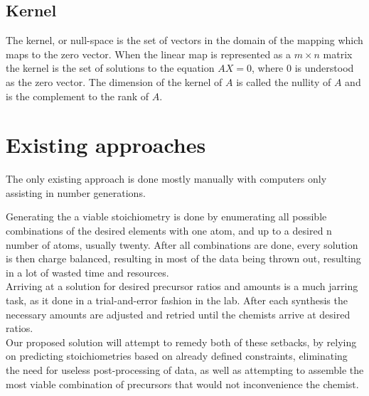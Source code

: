 \subsection{Kernel}
The kernel, or null-space is the set of vectors in the domain of the mapping which maps to the zero vector. When the linear map is represented as a $m \times n$ matrix the kernel is the set of solutions to the equation $AX = 0$, where $0$ is understood as the zero vector. The dimension of the kernel of $A$ is called the nullity of $A$ and is the complement to the rank of $A$.

\section{Existing approaches}
The only existing approach is done mostly manually with computers only assisting in number generations.

Generating the a viable stoichiometry is done by enumerating all possible combinations of the desired elements with one atom, and up to a desired n number of atoms, usually twenty. After all combinations are done, every solution is then charge balanced, resulting in most of the data being thrown out, resulting in a lot of wasted time and resources. \\

Arriving at a solution for desired precursor ratios and amounts is a much jarring task, as it done in a trial-and-error fashion in the lab. After each synthesis the necessary amounts are adjusted and retried until the chemists arrive at desired ratios. \\

Our proposed solution will attempt to remedy both of these setbacks, by relying on predicting stoichiometries based on already defined constraints, eliminating the need for useless post-processing of data, as well as attempting to assemble the most viable combination of precursors that would not inconvenience the chemist.\\
